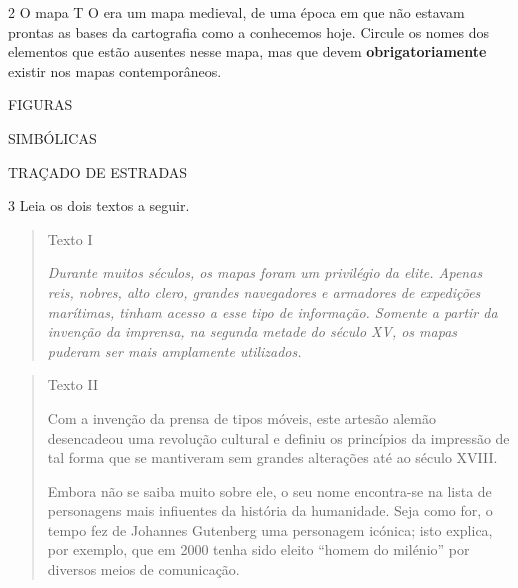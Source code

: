 \num{2} O mapa T O era um mapa medieval, de uma época em que não estavam prontas as
bases da cartografia como a conhecemos hoje. Circule os nomes dos elementos que estão ausentes nesse mapa, mas que devem
\textbf{obrigatoriamente} existir nos mapas contemporâneos.

\begin{multicols}{2}

FIGURAS


SIMBÓLICAS

TRAÇADO DE ESTRADAS
\end{multicols}


\num{3} Leia os dois textos a seguir.

\begin{quote}
Texto I

\emph{Durante muitos séculos, os mapas foram um privilégio da elite.
Apenas reis, nobres, alto clero, grandes navegadores e armadores de
expedições marítimas, tinham acesso a esse tipo de informação. Somente a
partir da invenção da imprensa, na segunda metade do século XV, os mapas
puderam ser mais amplamente utilizados.}

\end{quote}

\begin{quote}
Texto II

Com a invenção da prensa de tipos móveis, este artesão alemão
desencadeou uma revolução cultural e definiu os princípios da impressão
de tal forma que se mantiveram sem grandes alterações até ao século
XVIII.

Embora não se saiba muito sobre ele, o seu nome encontra-se na
lista de personagens mais infiuentes da história da humanidade. Seja
como for, o tempo fez de Johannes Gutenberg uma personagem icónica; isto
explica, por exemplo, que em 2000 tenha sido eleito ``homem do milénio''
por diversos meios de comunicação.

\end{quote}

